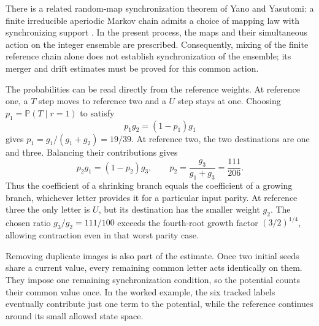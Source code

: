 There is a related random-map synchronization theorem of Yano and
Yasutomi: a finite irreducible aperiodic Markov chain admits a choice
of mapping law with synchronizing support
\cite{yano-yasutomi-2011}. In the present process, the maps
and their simultaneous action on the integer ensemble are prescribed.
Consequently, mixing of the finite reference chain alone does not
establish synchronization of the ensemble; its merger and drift
estimates must be proved for this common action.

The probabilities can be read directly from the reference weights.
At reference one, a $T$ step moves to reference two and a $U$ step
stays at one. Choosing $p_1=\mathbb P(T\mid r=1)$ to satisfy
\[
 p_1g_2=(1-p_1)g_1
\]
gives $p_1=g_1/(g_1+g_2)=19/39$. At reference two, the two
destinations are one and three. Balancing their contributions gives
\[
 p_2g_1=(1-p_2)g_3,
 \qquad p_2=\frac{g_3}{g_1+g_3}=\frac{111}{206}.
\]
Thus the coefficient of a shrinking branch equals the coefficient
of a growing branch, whichever letter provides it for a particular
input parity. At reference three the only letter is $U$, but its
destination has the smaller weight $g_2$. The chosen ratio
$g_3/g_2=111/100$ exceeds the fourth-root growth factor
$(3/2)^{1/4}$, allowing contraction even in that worst parity case.

Removing duplicate images is also part of the estimate. Once two
initial seeds share a current value, every remaining common letter
acts identically on them. They impose one remaining synchronization
condition, so the potential counts their common value once. In the
worked example, the six tracked labels eventually contribute just
one term to the potential, while the reference continues around its
small allowed state space.

